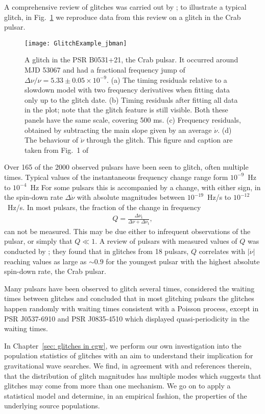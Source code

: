 A comprehensive review of glitches was carried out by
\citet{Espinoza2011}; to illustrate a typical glitch, in Fig.~\ref{fig: glitch}
we reproduce data from this review on a glitch in the Crab pulsar.
\begin{figure}[htb]
    \centering
    \texttt{[image: GlitchExample\_jbman]}
    \caption{
A glitch in the PSR B0531+21, the Crab pulsar. It occurred around MJD
53067 and had a fractional frequency jump of $\Delta\nu/\nu = 5.33 \pm 0.05
\times 10^{−9}$. (a) The timing residuals relative to a
slowdown model with two frequency derivatives when fitting data only up to the
glitch date. (b) Timing residuals after fitting all data in the plot; note
that the glitch feature is still visible. Both these panels have the same
scale, covering 500 ms. (c) Frequency residuals, obtained by subtracting the
main slope given by an average $\dot\nu$. (d) The behaviour of $\dot\nu$
through the glitch. This figure and caption are taken from Fig.~1 of
\citet{Espinoza2011}}
    \label{fig: glitch}
\end{figure}

Over 165 of the 2000 observed pulsars have been seen to glitch, often multiple
times. Typical values of the instantaneous frequency change range form
$10^{-9}$~Hz to $10^{-4}$~Hz For some pulsars this is accompanied by a change,
with either sign, in the spin-down rate $\Delta\dot{\nu}$ with absolute
magnitudes between $10^{-19}$~Hz/s to $10^{-12}$~Hz/s.
In most pulsars, the fraction of the change in frequency
\begin{align}
Q = \frac{\Delta\nu_\textrm{t}}{\Delta\nu + \Delta\nu_\textrm{t}},
\end{align}
can not be measured. This may be due either to infrequent observations of the
pulsar, or simply that $Q\ll1$.  A review of pulsars with measured values of
$Q$ was conducted by \citet{Lyne2000}; they found that in glitches from 18
pulsars, $Q$ correlates with $|\dot{\nu}|$ reaching values as large as
$\sim0.9$ for the youngest pulsar with the highest absolute spin-down rate,
the Crab pulsar.

Many pulsars have been observed to glitch several times, \citet{Melatos2008}
considered the waiting times between glitches and concluded that in most
glitching pulsars the glitches happen randomly with waiting times consistent
with a Poisson process, except in PSR J0537-6910 and PSR J0835-4510 which
displayed quasi-periodicity in the waiting times.

In Chapter~\ref{sec: glitches in cgw}, we perform our own investigation into the
population statistics of glitches with an aim to understand their implication
for gravitational wave searches. We find, in agreement with
\citet{Espinoza2011} and references therein, that the distribution of glitch
magnitudes has multiple modes which suggests that glitches may come from more
than one mechanism. We go on to apply a statistical model and determine, in an
empirical fashion, the properties of the underlying source populations.

